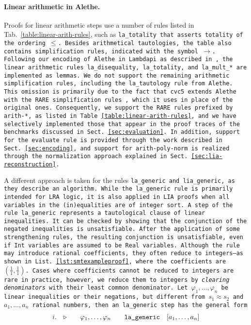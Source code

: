 \paragraph{Linear arithmetic in Alethe.}
\label{sssect:la-in-alethe}

Proofs for linear arithmetic steps use a number of rules listed in Tab.~\ref{table:linear-arith-rules}, such as \tt{la\_totality} that asserts totality of the ordering~$\leq$. 
Besides arithmetical tautologies, the table also contains simplification rules, indicated with the symbol~$\rightarrow$.
Following our encoding of Alethe in Lambdapi as described in \cite{ColtellacciMD24}, the linear arithmetic rules \tt{la\_disequality}, \tt{la\_totality}, and \tt{la\_mult\_*} are implemented as lemmas.
We do not support the remaining arithmetic simplification rules, including the \tt{la\_tautology} rule from Alethe.
This omission is primarily due to the fact that cvc5 extends Alethe with the RARE simplification rules \cite{rare}, which it uses in place of the original ones.
Consequently, we support the RARE rules prefixed by \tt{arith-*}, as listed in Table~\ref{table:linear-arith-rules}, and we have selectively implemented those that appear in the proof traces of the benchmarks discussed in Sect.~\ref{sec:evaluation}.
In addition, support for the \tt{evaluate} rule is provided through the work described in Sect.~\ref{sec:encoding}, and support for \tt{arith-poly-norm} is realized through the normalization approach explained in Sect.~\ref{sec:lia-reconstruction}.

A different approach is taken for the rules \tt{la\_generic} and \tt{lia\_generic}, as they describe an algorithm.
While the \tt{la\_generic rule} is primarily intended for LRA logic, it is also applied in LIA proofs when all variables in the (in)equalities are of integer sort.
A step of the rule \tt{la\_generic} represents a tautological clause of linear inequalities.  It can be checked by showing that the conjunction of
the negated inequalities is unsatisfiable. After the application of some strengthening rules, the resulting conjunction is unsatisfiable,
even if \lstinline[language=SMT,basicstyle=\ttfamily\footnotesize\upshape]{Int} variables are assumed to be \lstinline[language=SMT,basicstyle=\ttfamily\footnotesize\upshape]{Real} variables.
Although the rule may introduce rational coefficients, they often reduce to integers—as shown in List.~\ref{lst:smtexampleproof}, where the coefficients are $(\frac{1}{1}, \frac{1}{1})$.
Cases where coefficients cannot be reduced to integers are rare in practice, however, we reduce them to integers by \emph{clearing denominators} with their least common denominator.
Let $\varphi_1,\dots, \varphi_n$ be linear inequalities or their negations, but different from $s_1 \approx s_2$ and $a_1, \dots, a_n$ rational numbers, then an \tt{la\_generic} step has the general form
%
\[
\begin{matrix*}[c]
  i. & \ctxsep \quad & \varphi_1 , \dots , \varphi_n & \quad \tt{la\_generic}  & [a_1, \dots, a_n] \\
\end{matrix*}
\]

